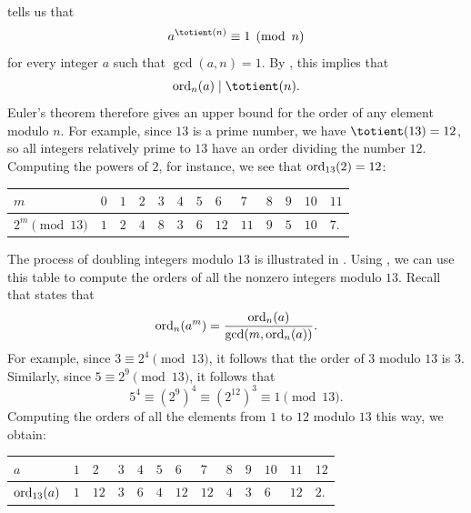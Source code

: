  tells us that
\begin{equation*}
  a^{\totient(n)}\equiv 1\pmod{n}
\end{equation*}
for every integer $a$ such that $\gcd(a,n)=1$. By , this implies that
\begin{equation*}
  \ord_n(a)\mid \totient(n).
\end{equation*}
Euler's theorem therefore gives an upper bound for the order of any element modulo $n$. For example, since $13$ is a prime number, we have $\totient(13)=12$, so all integers relatively prime to $13$ have an order dividing the number $12$. Computing the powers of $2$, for instance, we see that $\operatorname{ord}_{13}(2)=12$:
\begin{center}
  \begin{tabular}{l*{12}{C}}
    $m$             & $0$ & $1$ & $2$ & $3$ & $4$ & $5$ & $6$ & $7$ & $8$ & $9$ & $10$ & $11$ \\ \midrule
    $2^m \pmod{13}$ & $1$ & $2$ & $4$ & $8$ & $3$ & $6$ & $12$ & $11$ & $9$ & $5$ & $10$ & $7$.
  \end{tabular}
\end{center}
The process of doubling integers modulo $13$ is illustrated in . Using , we can use this table to compute the orders of all the nonzero integers modulo $13$. Recall that  states that
\begin{equation*}
  \operatorname{ord}_n(a^m)=\frac{\operatorname{ord}_n(a)}{\gcd(m,\operatorname{ord}_n(a))}.
\end{equation*}
For example, since $3\equiv 2^4\pmod{13}$, it follows that the order of $3$ modulo $13$ is $3$. Similarly, since $5\equiv 2^9\pmod{13}$, it follows that
\begin{equation*}
  5^4 \equiv (2^9)^4 \equiv (2^{12})^3 \equiv 1 \pmod{13}.
\end{equation*}
Computing the orders of all the elements from $1$ to $12$ modulo $13$ this way, we obtain:
\begin{center}
  \begin{tabular}{l*{12}{C}}
    $a$           & $1$ & $2$  & $3$ & $4$ & $5$ & $6$ & $7$ & $8$ & $9$ & $10$ & $11$ & $12$ \\ \midrule
    $\operatorname{ord}_{13}(a)$ & $1$ & $12$ & $3$ & $6$ & $4$ & $12$ & $12$ & $4$ & $3$ & $6$ & $12$ & $2$.
  \end{tabular}
\end{center}

